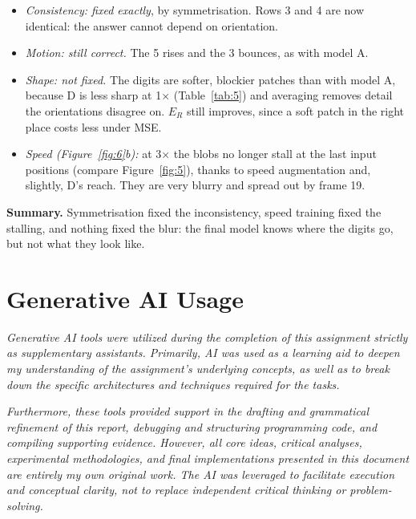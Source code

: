 \documentclass[11pt, a4paper]{article}
\begin{document}
\begin{itemize}[itemsep=0pt]
  \item \emph{Consistency: fixed exactly}, by symmetrisation. Rows 3 and 4 are now identical: the answer cannot depend on orientation.
  \item \emph{Motion: still correct.} The 5 rises and the 3 bounces, as with model A.
  \item \emph{Shape: not fixed.} The digits are softer, blockier patches than with model A, because D is less sharp at 1$\times$ (Table~\ref{tab:5}) and averaging removes detail the orientations disagree on. $E_R$ still improves, since a soft patch in the right place costs less under MSE.
  \item \emph{Speed (Figure~\ref{fig:6}b):} at 3$\times$ the blobs no longer stall at the last input positions (compare Figure~\ref{fig:5}), thanks to speed augmentation and, slightly, D's reach. They are very blurry and spread out by frame 19.
\end{itemize}

\textbf{Summary.} Symmetrisation fixed the inconsistency, speed training fixed the stalling, and nothing fixed the blur: the final model knows where the digits go, but not what they look like.
\section*{Generative AI Usage}

\textit{Generative AI tools were utilized during the completion of this assignment strictly as supplementary assistants. Primarily, AI was used as a learning aid to deepen my understanding of the assignment's underlying concepts, as well as to break down the specific architectures and techniques required for the tasks.} 

\textit{Furthermore, these tools provided support in the drafting and grammatical refinement of this report, debugging and structuring programming code, and compiling supporting evidence. However, all core ideas, critical analyses, experimental methodologies, and final implementations presented in this document are entirely my own original work. The AI was leveraged to facilitate execution and conceptual clarity, not to replace independent critical thinking or problem-solving.}
\end{document}
